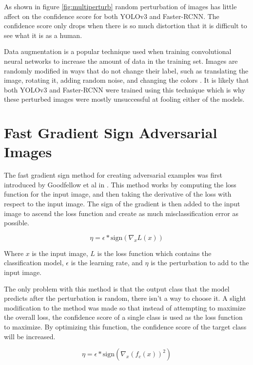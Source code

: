 \documentclass{article}
\begin{document}
As shown in figure \ref{fig:multiperturb} random perturbation of images has little affect on the confidence score for both YOLOv3 and Faster-RCNN. The confidence score only drops when there is so much distortion that it is difficult to see what it is as a human.

Data augmentation is a popular technique used when training convolutional neural networks to increase the amount of data in the training set. Images are randomly modified in ways that do not change their label, such as translating the image, rotating it, adding random noise, and changing the colors \cite{shorten2019survey}. It is likely that both YOLOv3 and Faster-RCNN were trained using this technique which is why these perturbed images were mostly unsuccessful at fooling either of the models.

\section{Fast Gradient Sign Adversarial Images}

The fast gradient sign method for creating adversarial examples was first introduced by Goodfellow et al in \cite{goodfellow2015explaining}. This method works by computing the loss function for the input image, and then taking the derivative of the loss with respect to the input image. The sign of the gradient is then added to the input image to ascend the loss function and create as much misclassification error as possible.

\begin{equation}
    \eta = \epsilon * \text{sign} (\nabla_x L(x))
\end{equation}

Where $x$ is the input image, $L$ is the loss function which contains the classification model, $\epsilon$ is the learning rate, and $\eta$ is the perturbation to add to the input image.

The only problem with this method is that the output class that the model predicts after the perturbation is random, there isn't a way to choose it. A slight modification to the method was made so that instead of attempting to maximize the overall loss, the confidence score of a single class is used as the loss function to maximize. By optimizing this function, the confidence score of the target class will be increased.

\begin{equation}
    \eta = \epsilon * \text{sign} (\nabla_x (f_c(x))^2)
\end{equation}
\end{document}
